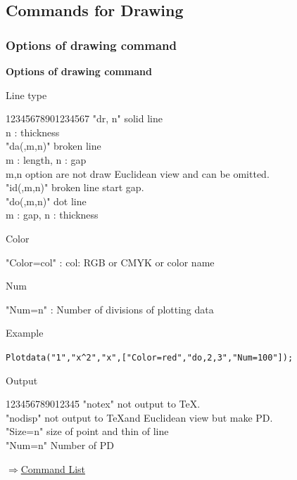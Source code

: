 \documentclass[papersize,a4paper,12pt]{article}
\newenvironment{cmd}[2]{
\hypertarget{#2}{}
\begin{center}{\bf\large #1}\end{center}
\begin{description}
}{
\end{description}
\begin{flushright} \hyperlink{functionlist}{$\Rightarrow$Command List}\end{flushright}
}
\begin{document}
\subsection{Commands for Drawing}

\subsubsection{Options of drawing command}

\begin{cmd}{Options of drawing command}{options}

\item Line type

\begin{tabbing}
1234\=5678901234567\=\kill
  \>    "dr, n"     \>solid line\\
  \>                    \> n : thickness\\
  \>    "da(,m,n)"  \>broken line \\
  \>                \> m : length, n : gap \\
  \>                 \>m,n option are not draw Euclidean view and can be omitted.\\
  \>    "id(,m,n)"   \>broken line start gap.\\
  \>    "do(,m,n)"  \>dot line\\
  \>                \>m : gap, n : thickness
\end{tabbing}

\item Color 

\hspace{10mm}"Color=col" : col: RGB or CMYK or color name

\item Num

\hspace{10mm}"Num=n" : Number of divisions of plotting data

\vspace{\baselineskip}
\hspace{5mm} Example

\hspace{10mm} \verb|Plotdata("1","x^2","x",["Color=red","do,2,3","Num=100"]);|

\item Output
\begin{tabbing}
  1234\=56789012345\=\kill
 \>    "notex"  \>not output to \TeX.\\
 \>    "nodisp" \>not output to \TeX and Euclidean view but make PD.\\
 \>    "Size=n"  \> size of point and thin of line\\
 \>    "Num=n"  \>Number of PD
\end{tabbing}


\end{cmd}
\end{document}
